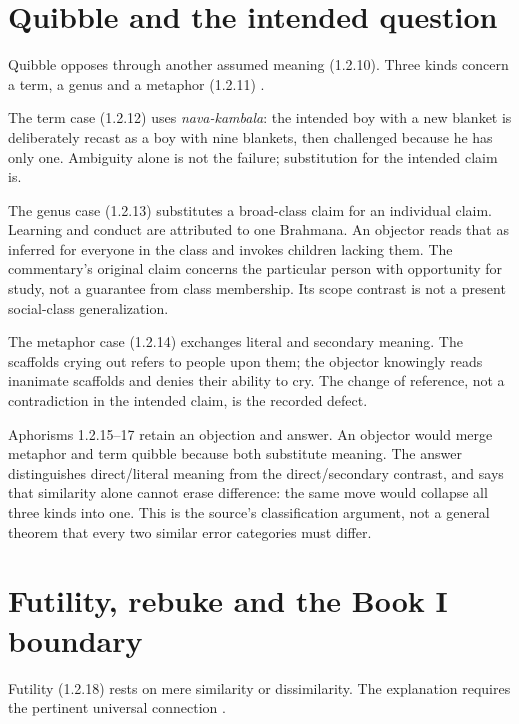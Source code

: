 \section{Quibble and the intended question}
\label{sec:p13-nyaya-quibble}

Quibble opposes through another assumed meaning (1.2.10).
Three kinds concern a term, a genus and a metaphor (1.2.11)
\cite[1.2.10--17, pp.~17--19]{GotamaVidyabhusana1913NyayaSutras}.

The term case (1.2.12) uses \emph{nava-kambala}: the intended boy with
a new blanket is deliberately recast as a boy with nine blankets,
then challenged because he has only one. Ambiguity alone is not the
failure; substitution for the intended claim is.

The genus case (1.2.13) substitutes a broad-class claim for an individual
claim. Learning and conduct are attributed to one Brahmana. An objector
reads that as inferred for everyone in the class and invokes children
lacking them. The commentary's original claim concerns the particular
person with opportunity for study, not a guarantee from class membership.
Its scope contrast is not a present social-class generalization.

The metaphor case (1.2.14) exchanges literal and secondary meaning.
The scaffolds crying out refers to people upon them; the objector
knowingly reads inanimate scaffolds and denies their ability to cry.
The change of reference, not a contradiction in the intended claim,
is the recorded defect.

Aphorisms 1.2.15--17 retain an objection and answer. An objector would
merge metaphor and term quibble because both substitute meaning.
The answer distinguishes direct/literal meaning from the direct/secondary
contrast, and says that similarity alone cannot erase difference:
the same move would collapse all three kinds into one.
This is the source's classification argument, not a general theorem
that every two similar error categories must differ.

\section{Futility, rebuke and the Book I boundary}
\label{sec:p13-nyaya-futility-rebuke}

Futility (1.2.18) rests on mere similarity or dissimilarity.
The explanation requires the pertinent universal connection
\cite[1.2.18--20, pp.~20--21]{GotamaVidyabhusana1913NyayaSutras}.

